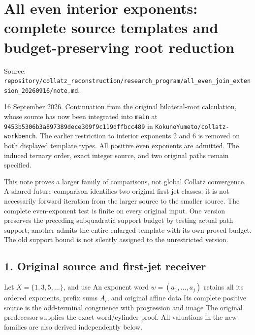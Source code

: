 \chapter{All even interior exponents: complete source templates and
budget-preserving root reduction}
{\small\sffamily Source: \nolinkurl{repository/collatz_reconstruction/research_program/all_even_join_extension_20260916/note.md}.\par}


16 September 2026. Continuation from the original bilateral-root
calculation, whose source has now been integrated into \nolinkurl{main}
at \nolinkurl{9453b5306b3a897389dece309f9c119dffbcc489} in
\nolinkurl{KokunoYumeto/collatz-workbench}. The earlier restriction to
interior exponents 2 and 6 is removed on both displayed template types.
All positive even exponents are admitted. The induced ternary order,
exact integer source, and two original paths remain specified.

This note proves a larger family of comparisons, not global Collatz
convergence. A shared-future comparison identifies two original
first-jet classes; it is not necessarily forward iteration from the
larger source to the smaller source. The complete even-exponent test is
finite on every original input. One version preserves the preceding
subquadratic support budget by testing actual path support; another
admits the entire enlarged template with its own proved budget. The old
support bound is not silently assigned to the unrestricted version.

\section{1. Original source and first-jet receiver}

Let \(X=\{1,3,5,\ldots\}\), and use
 An exponent word
\(w=(a_1,\ldots,a_j)\) retains all its ordered exponents, prefix sums
\(A_i\), and original affine data
 Its complete positive source is the
odd-terminal congruence
with progression and image
 The original predecessor
supplies the exact word/cylinder proof. All valuations in the new
families are also derived independently below.

